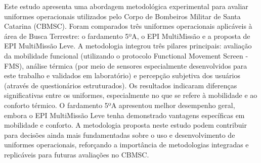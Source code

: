 Este estudo apresenta uma abordagem metodológica experimental para avaliar uniformes operacionais 
utilizados pelo Corpo de Bombeiros Militar de Santa Catarina (CBMSC). Foram comparados três uniformes 
operacionais aplicáveis à área de Busca Terrestre: o fardamento 5ºA, o EPI MultiMissão e a proposta de 
EPI MultiMissão Leve. A metodologia integrou três pilares principais: avaliação da mobilidade 
funcional (utilizando o protocolo Functional Movement Screen - FMS), análise térmica (por meio de 
sensores especialmente desenvolvidos para este trabalho e validados em laboratório) e percepção 
subjetiva dos usuários (através de questionários estruturados). Os resultados indicaram diferenças 
significativas entre os uniformes, especialmente no que se refere à mobilidade e ao conforto térmico. 
O fardamento 5ºA apresentou melhor desempenho geral, embora o EPI MultiMissão Leve tenha demonstrado 
vantagens específicas em mobilidade e conforto. A metodologia proposta neste estudo 
podem contribuir para decisões ainda mais fundamentadas sobre o uso e desenvolvimento de 
uniformes operacionais, reforçando a importância de metodologias integradas e replicáveis para 
futuras avaliações no CBMSC.